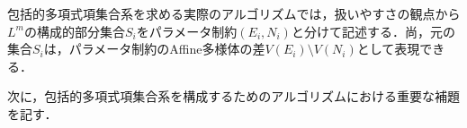 \begin{remark}
	包括的多項式項集合系を求める実際のアルゴリズムでは，扱いやすさの観点から$L^m$の構成的部分集合$S_i$をパラメータ制約$(E_i, N_i)$と分けて記述する．尚，元の集合$S_i$は，パラメータ制約のAffine多様体の差$V(E_i) \setminus V(N_i)$として表現できる．
\end{remark}

次に，包括的多項式項集合系を構成するためのアルゴリズムにおける重要な補題を記す．